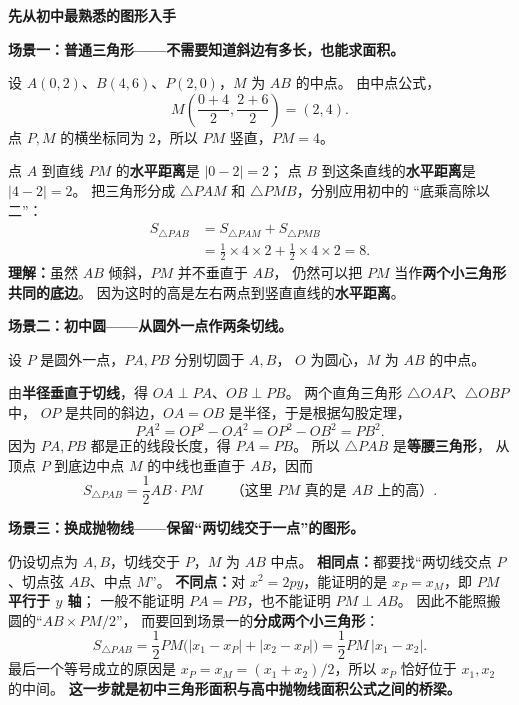 \begin{explanationbox}

    \textbf{\textcolor{CExplanation}{先从初中最熟悉的图形入手}}

    \textbf{场景一：普通三角形——不需要知道斜边有多长，也能求面积。}

    设 $A(0,2)$、$B(4,6)$、$P(2,0)$，$M$ 为 $AB$ 的中点。
    由中点公式，
    \[
        M\left(\frac{0+4}{2},\frac{2+6}{2}\right)=(2,4).
    \]
    点 $P,M$ 的横坐标同为 $2$，所以 $PM$ 竖直，$PM=4$。
    
    点 $A$ 到直线 $PM$ 的\textbf{水平距离}是 $|0-2|=2$；
    点 $B$ 到这条直线的\textbf{水平距离}是 $|4-2|=2$。
    把三角形分成 $\triangle PAM$ 和 $\triangle PMB$，分别应用初中的
    “底乘高除以二”：
    \[
    \begin{aligned}
        S_{\triangle PAB}
        &=S_{\triangle PAM}+S_{\triangle PMB}\\
        &=\frac12\times4\times2+\frac12\times4\times2
          =\boxed{8}.
    \end{aligned}
    \]
    \textbf{理解：}虽然 $AB$ 倾斜，$PM$ 并不垂直于 $AB$，
    仍然可以把 $PM$ 当作\textbf{两个小三角形共同的底边}。
    因为这时的高是左右两点到竖直直线的\textbf{水平距离}。

    \medskip
    \textbf{场景二：初中圆——从圆外一点作两条切线。}

    设 $P$ 是圆外一点，$PA,PB$ 分别切圆于 $A,B$，
    $O$ 为圆心，$M$ 为 $AB$ 的中点。
    
    由\textbf{半径垂直于切线}，得 $OA\perp PA$、$OB\perp PB$。
    两个直角三角形 $\triangle OAP$、$\triangle OBP$ 中，
    $OP$ 是共同的斜边，$OA=OB$ 是半径，于是根据勾股定理，
    \[
        PA^2=OP^2-OA^2=OP^2-OB^2=PB^2.
    \]
    因为 $PA,PB$ 都是正的线段长度，得 $PA=PB$。
    所以 $\triangle PAB$ 是\textbf{等腰三角形}，
    从顶点 $P$ 到底边中点 $M$ 的中线也垂直于 $AB$，因而
    \[
        \boxed{S_{\triangle PAB}=\frac12 AB\cdot PM}
        \qquad\text{（这里 $PM$ 真的是 $AB$ 上的高）}.
    \]

    \textbf{场景三：换成抛物线——保留“两切线交于一点”的图形。}

    仍设切点为 $A,B$，切线交于 $P$，$M$ 为 $AB$ 中点。
    \textbf{相同点：}都要找“两切线交点 $P$、切点弦 $AB$、中点 $M$”。
    \textbf{不同点：}对 $x^2=2py$，能证明的是
    $x_P=x_M$，即 $PM$\textbf{平行于 $y$ 轴}；
    一般不能证明 $PA=PB$，也不能证明 $PM\perp AB$。
    因此不能照搬圆的“$AB\times PM/2$”，
    而要回到场景一的\textbf{分成两个小三角形}：
    \[
        \boxed{S_{\triangle PAB}
        =\frac12 PM\bigl(|x_1-x_P|+|x_2-x_P|\bigr)
        =\frac12 PM\,|x_1-x_2|}.
    \]
    最后一个等号成立的原因是
    $x_P=x_M=(x_1+x_2)/2$，所以 $x_P$ 恰好位于 $x_1,x_2$ 的中间。
    \textbf{这一步就是初中三角形面积与高中抛物线面积公式之间的桥梁。}


\end{explanationbox}
